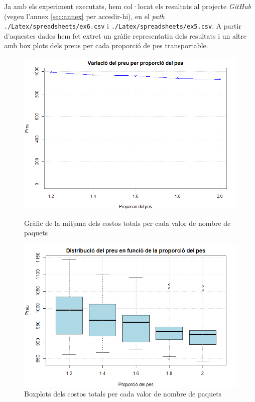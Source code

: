 \documentclass[a4paper]{article}
\begin{document}
	Ja amb els experiment executats, hem col·locat els resultats al projecte \textit{GitHub} (vegeu l'annex \ref{sec:annex} per accedir-hi), en el \textit{path} \texttt{./Latex/spreadsheets/ex6.csv} i \texttt{./Latex/spreadsheets/ex5.csv}. A partir d'aquestes dades hem fet extret un gràfic representatiu dels resultats i un altre amb box plots dels preus per cada proporció de pes transportable.
	
	\begin{figure}[H]
		\centering
		\begin{minipage}{0.45\textwidth}
			\centering
			\includegraphics[width=\textwidth]{exp5_grafic_lineal.png}
			\caption{Gràfic de la mitjana dels costos totals per cada valor de nombre de paquets}
			\label{fig:exp5_grafic_lineal}
		\end{minipage}\hfill
		\begin{minipage}{0.45\textwidth}
			\centering
			\includegraphics[width=\textwidth]{images/exp5_boxplot.png}
			\caption{Boxplots dels costos totals per cada valor de nombre de paquets}
			\label{fig:exp5_boxplot}
		\end{minipage}
	\end{figure}
	
\end{document}
